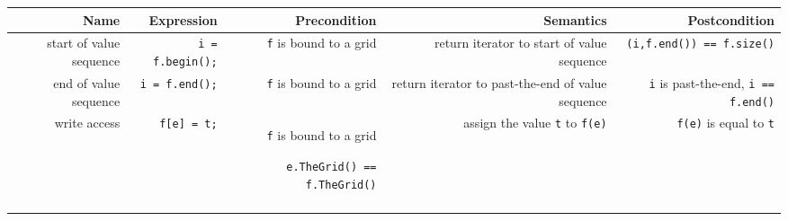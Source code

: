 \begin{tabularx}{15cm}{RRRRR} 
  \T \hline
  \bf  Name     &
  \bf  Expression &
  \bf  Precondition&
  \bf  Semantics &
  \bf  Postcondition
  \\
  \hline
  start of value sequence  &
  {\tt i = f.begin();} &
  {\tt f} is bound to a grid  &
  return iterator to start of value sequence &
  {\tt  {}(i,f.end()) == f.size()}
  \\ 
  end of value sequence  &
  {\tt i = f.end();} &
  {\tt f} is bound to a grid  &
  return iterator to past-the-end of value sequence &
  {\tt i} is past-the-end, {\tt i == f.end()}
  \\ 
  write access &
  {\tt f[e] = t;} &
  {\tt f} is bound to a grid
  \par {\tt e.TheGrid() == f.TheGrid()}
  &
  assign the value {\tt t} to {\tt f(e)} &
  {\tt f(e)} is equal to {\tt t}
  \T \\   \hline  \\
\end{tabularx}


\W{}

\W{}
    

 ~
 ~

  

